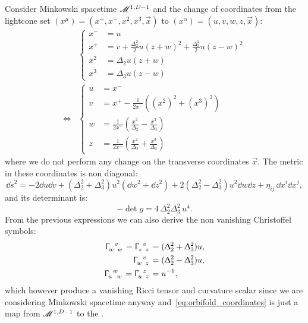 Consider Minkowski spacetime $\mathscr{M}^{1,D-1}$ and the change of coordinates from the lightcone set $( x^{\mu} ) = ( x^+, x^-, x^2, x^3, \vec{x} )$ to $( x^{\alpha} ) = ( u, v, w, z, \vec{x} )$:
\begin{equation}
  \begin{split}
    &\begin{cases}
      x^- & = u
      \\
      x^+ & = v + \frac{\Delta_2^2}{2} u ( z + w )^2 + \frac{\Delta_3^2}{2} u ( z - w )^2
      \\
      x^2 & = \Delta_2 u ( z + w )
      \\
      x^3 & = \Delta_3 u ( z - w )
    \end{cases}
    \\
    \Leftrightarrow
    &\begin{cases}
      u & = x^-
      \\
      v & = x^+ - \frac{1}{2 x^-} \left( (x^2)^2 + (x^3)^2 \right)
      \\
      w & = \frac{1}{2x^-} \left( \frac{x^2}{\Delta_2} - 
                                  \frac{x^3}{\Delta_3} \right)
      \\
      z & = \frac{1}{2x^-} \left( \frac{x^2}{\Delta_2} +
                                  \frac{x^3}{\Delta_3} \right)
    \end{cases}
  \end{split}
  \label{eq:orbifold_coordinates}
\end{equation}
where we do not perform any change on the transverse coordinates $\vec{x}$.
The metric in these coordinates is non diagonal:
\begin{equation}
  \dd{s}^2 = - 2 \dd{u}\dd{v} 
           + ( \Delta_2^2 + \Delta_3^2 ) u^2 ( \dd{w}^2 + \dd{z}^2 )
           + 2 ( \Delta_2^2 - \Delta_3^2 ) u^2 \dd{w}\dd{z}
           + \eta_{ij}\, \dd{x}^i \dd{x}^j,
  \label{eq:orbifold_metric}
\end{equation}
and its determinant is:
\begin{equation}
  - \det g  = 4\, \Delta_2^2 \Delta_3^2\, u^4.
\end{equation}
From the previous expressions we can also derive the non vanishing Christoffel symbols:
\begin{equation}
  \begin{split}
    \tensor{\Gamma}{_w^v_w}
    =
    \tensor{\Gamma}{_z^v_z} & = ( \Delta_2^2 + \Delta_3^2 ) u,
    \\
    \tensor{\Gamma}{_w^v_z} & = ( \Delta_2^2 - \Delta_3^2 ) u,
    \\
    \tensor{\Gamma}{_u^w_w}
    =
    \tensor{\Gamma}{_u^z_z} & = u^{-1},
  \end{split}
\end{equation}
which however produce a vanishing Ricci tensor and curvature scalar since we are considering Minkowski spacetime anyway and~\eqref{eq:orbifold_coordinates} is just a map from $\mathscr{M}^{1,D-1}$ to the \gnbo.

